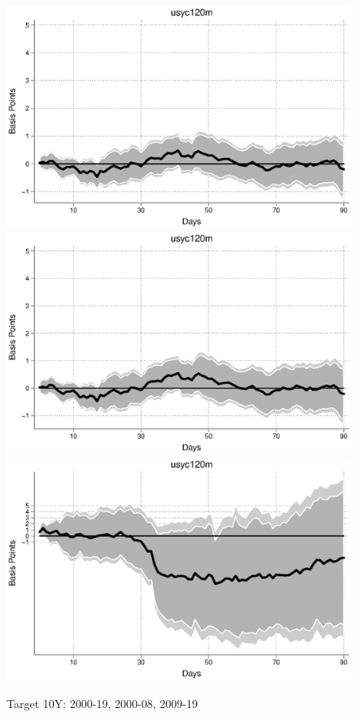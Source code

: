 \documentclass{article}
\begin{document}
\pagebreak[4]

\begin{figure}[tbph]
	\begin{center}
		\caption{Target 10Y: 2000-19, 2000-08, 2009-19}
		\includegraphics[trim={0cm 0cm 0cm 0cm},clip,height=0.3\textheight,width=1\textwidth]{../LagDep-FX/Target/US/usyc120m00-19target.eps} \\
		\includegraphics[trim={0cm 0cm 0cm 0cm},clip,height=0.3\textheight,width=1\textwidth]{../LagDep-FX/Target/US/usyc120m00-08target.eps} \\
		\includegraphics[trim={0cm 0cm 0cm 0cm},clip,height=0.3\textheight,width=1\textwidth]{../LagDep-FX/Target/US/usyc120m09-19target.eps} \\

\end{center}
\end{figure}
\end{document}
